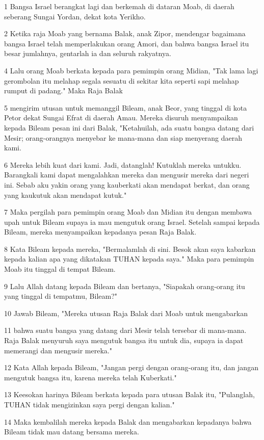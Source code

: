 \par 1 Bangsa Israel berangkat lagi dan berkemah di dataran Moab, di daerah seberang Sungai Yordan, dekat kota Yerikho.
\par 2 Ketika raja Moab yang bernama Balak, anak Zipor, mendengar bagaimana bangsa Israel telah memperlakukan orang Amori, dan bahwa bangsa Israel itu besar jumlahnya, gentarlah ia dan seluruh rakyatnya.
\par 4 Lalu orang Moab berkata kepada para pemimpin orang Midian, "Tak lama lagi gerombolan itu melahap segala sesuatu di sekitar kita seperti sapi melahap rumput di padang." Maka Raja Balak
\par 5 mengirim utusan untuk memanggil Bileam, anak Beor, yang tinggal di kota Petor dekat Sungai Efrat di daerah Amau. Mereka disuruh menyampaikan kepada Bileam pesan ini dari Balak, "Ketahuilah, ada suatu bangsa datang dari Mesir; orang-orangnya menyebar ke mana-mana dan siap menyerang daerah kami.
\par 6 Mereka lebih kuat dari kami. Jadi, datanglah! Kutuklah mereka untukku. Barangkali kami dapat mengalahkan mereka dan mengusir mereka dari negeri ini. Sebab aku yakin orang yang kauberkati akan mendapat berkat, dan orang yang kaukutuk akan mendapat kutuk."
\par 7 Maka pergilah para pemimpin orang Moab dan Midian itu dengan membawa upah untuk Bileam supaya ia mau mengutuk orang Israel. Setelah sampai kepada Bileam, mereka menyampaikan kepadanya pesan Raja Balak.
\par 8 Kata Bileam kepada mereka, "Bermalamlah di sini. Besok akan saya kabarkan kepada kalian apa yang dikatakan TUHAN kepada saya." Maka para pemimpin Moab itu tinggal di tempat Bileam.
\par 9 Lalu Allah datang kepada Bileam dan bertanya, "Siapakah orang-orang itu yang tinggal di tempatmu, Bileam?"
\par 10 Jawab Bileam, "Mereka utusan Raja Balak dari Moab untuk mengabarkan
\par 11 bahwa suatu bangsa yang datang dari Mesir telah tersebar di mana-mana. Raja Balak menyuruh saya mengutuk bangsa itu untuk dia, supaya ia dapat memerangi dan mengusir mereka."
\par 12 Kata Allah kepada Bileam, "Jangan pergi dengan orang-orang itu, dan jangan mengutuk bangsa itu, karena mereka telah Kuberkati."
\par 13 Keesokan harinya Bileam berkata kepada para utusan Balak itu, "Pulanglah, TUHAN tidak mengizinkan saya pergi dengan kalian."
\par 14 Maka kembalilah mereka kepada Balak dan mengabarkan kepadanya bahwa Bileam tidak mau datang bersama mereka.
